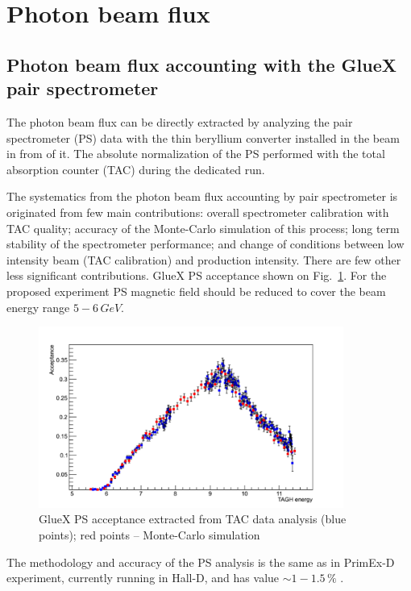 \section{Photon beam flux}

\subsection{Photon beam flux accounting with the GlueX pair spectrometer}
The photon beam flux can be directly extracted by analyzing the pair
spectrometer (PS) data with the thin beryllium converter installed in
the beam in from of it.  The absolute normalization of the PS
performed with the total absorption counter (TAC) during the dedicated
run.

The systematics from the photon beam flux accounting by pair
spectrometer is originated from few main contributions: overall
spectrometer calibration with TAC quality; accuracy of the Monte-Carlo
simulation of this process; long term stability of the spectrometer
performance; and change of conditions between low intensity beam (TAC
calibration) and production intensity.  There are few other less
significant contributions. GlueX PS acceptance \cite{hdnote3684} shown
on Fig.~\ref{fig:psacc}. For the proposed experiment PS magnetic field
should be reduced to cover the beam energy range $5-6\,GeV$.
\begin{figure}[tpb]
\begin{center}
\includegraphics[width=10cm,angle=0]{figures/ps_acceptance.pdf}
\end{center}
\caption{GlueX PS acceptance extracted from TAC data analysis (blue points);
red points -- Monte-Carlo simulation}
\label{fig:psacc}
\end{figure}
The methodology and accuracy of the PS analysis is the same as in
PrimEx-D experiment, currently running in Hall-D, and has value
$\sim1-1.5\,\%$ \cite{PrimexDexp}.

